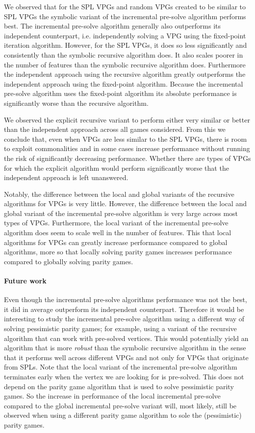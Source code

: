 We observed that for the SPL VPGs and random VPGs created to be similar to SPL VPGs the symbolic variant of the incremental pre-solve algorithm performs best. The incremental pre-solve algorithm generally also outperforms its independent counterpart, i.e. independently solving a VPG using the fixed-point iteration algorithm. However, for the SPL VPGs, it does so less significantly and consistently than the symbolic recursive algorithm does. It also scales poorer in the number of features than the symbolic recursive algorithm does. Furthermore the independent approach using the recursive algorithm greatly outperforms the independent approach using the fixed-point algorithm. Because the incremental pre-solve algorithm uses the fixed-point algorithm its absolute performance is significantly worse than the recursive algorithm.

We observed the explicit recursive variant to perform either very similar or better than the independent approach across all games considered. From this we conclude that, even when VPGs are less similar to the SPL VPGs, there is room to exploit commonalities and in some cases increase performance without running the risk of significantly decreasing performance. Whether there are types of VPGs for which the explicit algorithm would perform significantly worse that the independent approach is left unanswered.

Notably, the difference between the local and global variants of the recursive algorithms for VPGs is very little. However, the difference between the local and global variant of the incremental pre-solve algorithm is very large across most types of VPGs. Furthermore, the local variant of the incremental pre-solve algorithm does seem to scale well in the number of features. This that local algorithms for VPGs can greatly increase performance compared to global algorithms, more so that locally solving parity games increases performance compared to globally solving parity games.

\paragraph{Future work} Even though the incremental pre-solve algorithms performance was not the best, it did in average outperform its independent counterpart. Therefore it would be interesting to study the incremental pre-solve algorithm using a different way of solving pessimistic parity games; for example, using a variant of the recursive algorithm that can work with pre-solved vertices. This would potentially yield an algorithm that is more \textit{robust}  than the symbolic recursive algorithm in the sense that it performs well across different VPGs and not only for VPGs that originate from SPLs. Note that the local variant of the incremental pre-solve algorithm terminates early when the vertex we are looking for is pre-solved. This does not depend on the parity game algorithm that is used to solve pessimistic parity games. So the increase in performance of the local incremental pre-solve compared to the global incremental pre-solve variant will, most likely, still be observed when using a different parity game algorithm to sole the (pessimistic) parity games.

